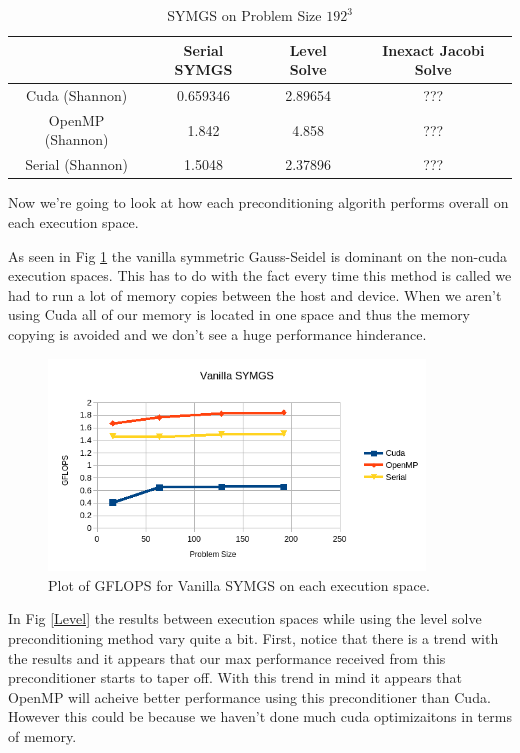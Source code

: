 \documentclass{ccr15}
\begin{document}
\begin{table}[h]
\begin{center}
\begin{tabular}{|c||c|c|c|}
\hline
& Serial SYMGS & Level Solve & Inexact Jacobi Solve \\
\hline \hline
Cuda (Shannon) & 0.659346 & 2.89654 & ??? \\
\hline
OpenMP (Shannon) & 1.842 & 4.858 & ??? \\
\hline
Serial (Shannon) & 1.5048 & 2.37896 & ??? \\
\hline
\end{tabular}
\caption{SYMGS on Problem Size $192^3$}
\label{SYMGS192}
\end{center}
\end{table}

Now we're going to look at how each preconditioning algorith performs overall on each execution
space.

As seen in Fig \ref{Vanilla} the vanilla symmetric Gauss-Seidel is dominant on the non-cuda
execution spaces. This has to do with the fact every time this method is called we had to run
a lot of memory copies between the host and device. When we aren't using Cuda all of our memory
is located in one space and thus the memory copying is avoided and we don't see a huge
performance hinderance.

\begin{figure}[H]
  \centering
  \includegraphics[width=10cm]{plots/ZAB-VanillaSYMGS.png}
  \caption{Plot of GFLOPS for Vanilla SYMGS on each execution space.}
	\label{Vanilla}
\end{figure}

In Fig \ref{Level} the results between execution spaces while using the level solve
preconditioning method vary quite a bit. First, notice that there is a trend with the results and
it appears that our max performance received from this preconditioner starts to taper off. With
this trend in mind it appears that OpenMP will acheive better performance using this
preconditioner than Cuda. However this could be because we haven't done much cuda optimizaitons
in terms of memory.
\end{document}
